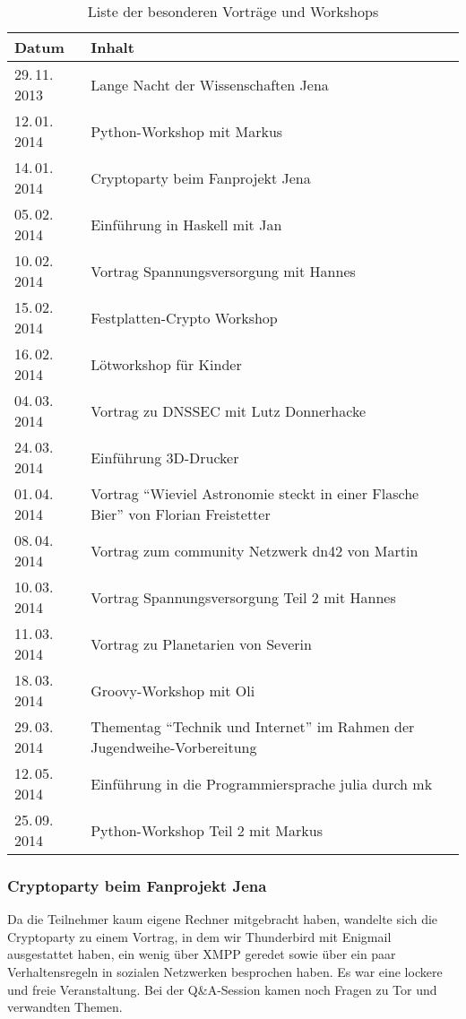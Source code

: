 \documentclass[ngerman]{scrartcl}
\begin{document}
\begin{table}[h]
  \centering{}
  \begin{tabularx}{\textwidth}{l|X}
	\textbf{Datum} & \textbf{Inhalt} \\ \midrule
	29.\,11.\,2013 & Lange Nacht der Wissenschaften Jena \\
	12.\,01.\,2014 & Python-Workshop mit Markus \\
	14.\,01.\,2014 & Cryptoparty beim Fanprojekt Jena \\
	05.\,02.\,2014 & Einführung in Haskell mit Jan \\
	10.\,02.\,2014 & Vortrag Spannungsversorgung mit Hannes \\
	15.\,02.\,2014 & Festplatten-Crypto Workshop \\
	16.\,02.\,2014 & Lötworkshop für Kinder \\
	04.\,03.\,2014 & Vortrag zu DNSSEC mit Lutz Donnerhacke \\
	24.\,03.\,2014 & Einführung 3D-Drucker \\
	01.\,04.\,2014 & Vortrag "`Wieviel Astronomie steckt in einer Flasche Bier"' von Florian Freistetter \\
	08.\,04.\,2014 & Vortrag zum community Netzwerk dn42 von Martin \\
	10.\,03.\,2014 & Vortrag Spannungsversorgung Teil 2 mit Hannes \\
	11.\,03.\,2014 & Vortrag zu Planetarien von Severin \\
	18.\,03.\,2014 & Groovy-Workshop mit Oli \\
	29.\,03.\,2014 & Thementag "`Technik und Internet"' im Rahmen der Jugendweihe-Vorbereitung \\
	12.\,05.\,2014 & Einführung in die Programmiersprache julia durch mk \\
	25.\,09.\,2014 & Python-Workshop Teil 2 mit Markus \\
\bottomrule
	\end{tabularx}
	\caption{Liste der besonderen Vorträge und Workshops}
\end{table}

\subsubsection{Cryptoparty beim Fanprojekt Jena}

Da die Teilnehmer kaum eigene Rechner mitgebracht haben, wandelte sich die
Cryptoparty zu einem Vortrag, in dem wir Thunderbird mit Enigmail ausgestattet
haben, ein wenig über XMPP geredet sowie über ein paar Verhaltensregeln in
sozialen Netzwerken besprochen haben. Es war eine lockere und freie
Veranstaltung. Bei der Q\&A-Session kamen noch Fragen zu Tor und verwandten
Themen.
\end{document}
